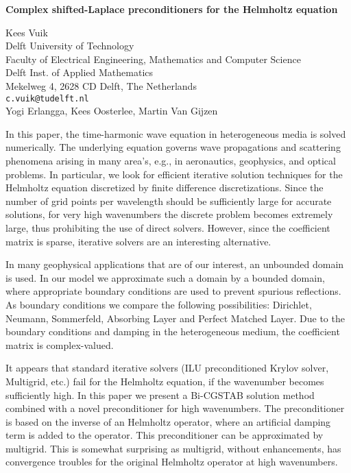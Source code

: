 \documentclass{report}
\begin{document}

\begin{center}
{\large
{\bf Complex shifted-Laplace preconditioners for the Helmholtz equation}}

	Kees Vuik \\
	Delft University of Technology \\
	Faculty of Electrical Engineering, Mathematics and Computer Science \\
	Delft Inst. of Applied Mathematics \\
	Mekelweg 4, 2628 CD Delft, The Netherlands \\
	{\tt c.vuik@tudelft.nl} \\
	Yogi Erlangga, Kees Oosterlee, Martin Van Gijzen
\end{center}
In this paper, the time-harmonic
wave equation in heterogeneous media is solved numerically.
The underlying equation governs wave propagations and
scattering phenomena arising in many area's, e.g., in
aeronautics, geophysics, and optical problems. In
particular, we look for efficient iterative solution
techniques for the Helmholtz equation discretized by finite
difference discretizations. Since the number of grid points
per wavelength should be sufficiently large for accurate
solutions, for very high wavenumbers the discrete problem
becomes extremely large, thus prohibiting the use of direct
solvers. However, since the coefficient matrix is sparse,
iterative solvers are an interesting alternative.

In many
geophysical applications that are of our interest, an
unbounded domain is used. In our model we approximate such a
domain by a bounded domain, where appropriate boundary
conditions are used to prevent spurious reflections. As
boundary conditions we compare the following possibilities:
Dirichlet, Neumann, Sommerfeld, Absorbing Layer and Perfect
Matched Layer. Due to the boundary conditions and damping in
the heterogeneous medium, the coefficient matrix is
complex-valued.

It appears that standard iterative
solvers (ILU preconditioned Krylov solver, Multigrid, etc.)
fail for the Helmholtz equation, if the wavenumber becomes
sufficiently high. In this paper we present a Bi-CGSTAB
solution method combined with a novel preconditioner for
high wavenumbers. The preconditioner is based on the inverse
of an Helmholtz operator, where an artificial damping term
is added to the operator. This preconditioner can be
approximated by multigrid. This is somewhat surprising as
multigrid, without enhancements, has convergence troubles
for the original Helmholtz operator at high wavenumbers.
\end{document}
